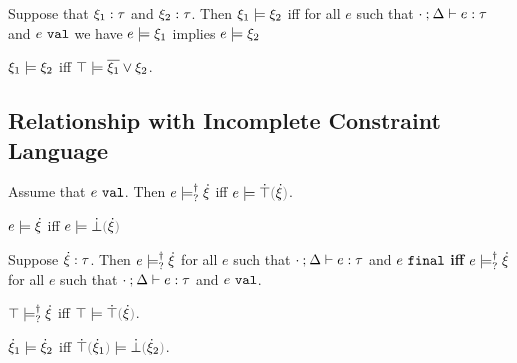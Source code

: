 \begin{definition}
  \label{defn:complete-constraint-entailment}
  Suppose that $\xi_1 : \tau$ and $\xi_2 : \tau$.
  Then $\xi_1 \models \xi_2$ iff for all $e$ such that $\cdot \mathbin{;} \Delta \vdash e : \tau$ and $e ~\mathtt{val}$ we have $e \models \xi_1$ implies $e \models \xi_2$
\end{definition}

\begin{lemma}
\label{lem:material-entailment}
  $\xi_1 \models \xi_2$ iff $\top \models \overline{\xi_1} \vee \xi_2$.
\end{lemma}

\subsection{Relationship with Incomplete Constraint Language}

\begin{lemma}
  \label{lem:val-satisfy-truify}
  Assume that $e ~\mathtt{val}$. Then $e \models_{?}^{\dag} \dot{\xi}$ iff $\ccsatisfy{e}{\ctruify{\hxi}}$.
\end{lemma}

\begin{lemma}
  \label{lem:satisfy-falsify}
  $e \models \dot{\xi}$ iff $\ccsatisfy{e}{\cfalsify{\hxi}}$
\end{lemma}

\begin{lemma}
  \label{lem:val-final-satormay}
  Suppose $\dot{\xi} : \tau$. Then $e \models_{?}^{\dag} \dot{\xi}$ for all $e$ such that $\cdot \mathbin{;} \Delta \vdash e : \tau$ and $e ~\mathtt{final}$ \textbf{iff} $e \models_{?}^{\dag} \dot{\xi}$ for all $e$ such that $\cdot \mathbin{;} \Delta \vdash e : \tau$ and $e ~\mathtt{val}$.
\end{lemma}

\begin{theorem}
\label{thrm:demystify-exhaustiveness}
$\top \models_{?}^{\dag} \dot{\xi}$ iff $\ccsatisfy{\ctruth}{\ctruify{\hxi}}$.
\end{theorem}

\begin{theorem}
\label{thrm:demystify-redundancy}
$\dot{\xi}_1 \models \dot{\xi}_2$ iff $\ccsatisfy{\ctruify{\hxi_1}}{\cfalsify{\hxi_2}}$.
\end{theorem}